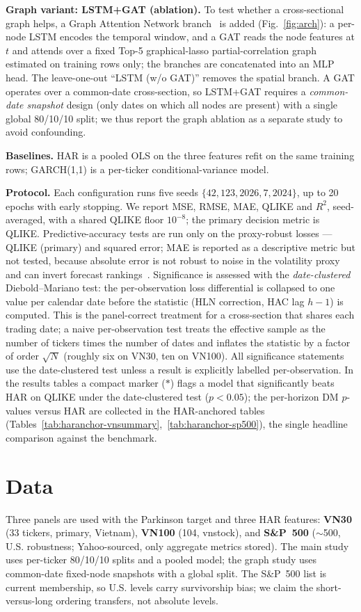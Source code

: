 \documentclass[runningheads]{llncs}
\begin{document}
\textbf{Graph variant: LSTM+GAT (ablation).} To test whether a cross-sectional graph helps, a Graph Attention
Network branch~\cite{gat2018} is added (Fig.~\ref{fig:arch}): a per-node LSTM encodes the temporal window,
and a GAT reads the node features at $t$ and attends over a fixed Top-5 graphical-lasso partial-correlation
graph estimated on training rows only; the branches are concatenated into an MLP head. The leave-one-out
``LSTM (w/o GAT)'' removes the spatial branch. A GAT operates over a common-date cross-section, so LSTM+GAT
requires a \emph{common-date snapshot} design (only dates on which all nodes are present) with a single
global 80/10/10 split; we thus report the graph ablation as a separate study to avoid confounding.

\textbf{Baselines.} HAR is a pooled OLS on the three features refit on the same training rows; GARCH(1,1) is
a per-ticker conditional-variance model.

\textbf{Protocol.} Each configuration runs five seeds $\{42,123,2026,7,2024\}$, up to 20 epochs with early
stopping. We report MSE, RMSE, MAE, QLIKE and $R^2$, seed-averaged, with a shared QLIKE floor $10^{-8}$; the
primary decision metric is QLIKE. Predictive-accuracy tests are run only on the proxy-robust losses --- QLIKE
(primary) and squared error; MAE is reported as a descriptive metric but not tested, because absolute error is
not robust to noise in the volatility proxy and can invert forecast rankings~\cite{patton2011}. Significance is
assessed with the \emph{date-clustered} Diebold--Mariano
test: the per-observation loss differential is collapsed to one value per calendar date before the statistic
(HLN correction, HAC lag $h{-}1$) is computed. This is the panel-correct treatment for a cross-section that
shares each trading date; a naive per-observation test treats the effective sample as the number of tickers
times the number of dates and inflates the statistic by a factor of order $\sqrt{N}$ (roughly six on VN30,
ten on VN100). All significance statements use the date-clustered test unless a result is explicitly labelled
per-observation. In the results tables a compact marker ($*$) flags a model that significantly beats HAR on
QLIKE under the date-clustered test ($p<0.05$); the per-horizon DM $p$-values versus HAR are collected in the
HAR-anchored tables (Tables~\ref{tab:haranchor-vnsummary},~\ref{tab:haranchor-sp500}), the single headline
comparison against the benchmark.

\section{Data}
Three panels are used with the Parkinson target and three HAR features: \textbf{VN30} (33 tickers, primary,
Vietnam), \textbf{VN100} (104, vnstock), and \textbf{S\&P~500} ($\sim$500, U.S. robustness; Yahoo-sourced,
only aggregate metrics stored). The main study uses per-ticker 80/10/10 splits and a pooled model; the graph
study uses common-date fixed-node snapshots with a global split. The S\&P~500 list is current membership, so
U.S. levels carry survivorship bias; we claim the short-versus-long ordering transfers, not absolute levels.
\end{document}
